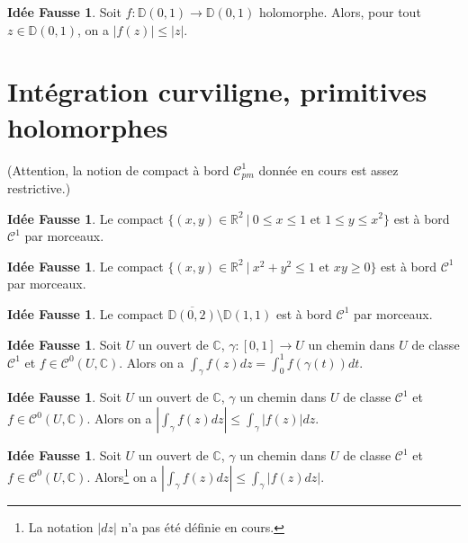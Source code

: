 \documentclass[11pt,a4paper]{article}
\newcommand{\D}{\mathbb{D}}
\newcommand{\R}{\mathbb{R}}
\newcommand{\C}{\mathbb{C}}
\theoremstyle{definition}
\newtheorem{ideeFausse}[theoreme]{Idée Fausse}
\theoremstyle{plain}
\begin{document}
\begin{ideeFausse}
Soit $f : \D(0,1)\to \D(0,1)$ holomorphe.
Alors, pour tout $z\in \D(0,1)$, on a $|f(z)| \leq |z|$.
\end{ideeFausse}



%
%



\section{Intégration curviligne, primitives holomorphes}
(Attention, la notion de compact à bord $\mathcal C^1_{pm}$ donnée en cours est assez restrictive.)

\begin{ideeFausse}
Le compact $\{(x,y)\in \R^2\:|\: 0\leq x \leq 1 \text{ et }1 \leq y \leq x^2\}$ est à bord $\mathcal C^1$ par morceaux.
\end{ideeFausse}

\begin{ideeFausse}
Le compact $\{(x,y)\in \R^2\:|\: x^2+y^2\leq 1 \text{ et } xy\geq 0\}$ est à bord $\mathcal C^1$ par morceaux.
\end{ideeFausse}

\begin{ideeFausse}
Le compact $\overline{\D(0,2)} \setminus \D(1,1)$ est à bord $\mathcal C^1$ par morceaux.
\end{ideeFausse}

\begin{ideeFausse}
Soit $U$ un ouvert de $\C$, $\gamma : [0,1]\to U$ un chemin dans $U$ de classe $\mathcal C^1$ et $f \in \mathcal C^0(U,\C)$.
Alors on a $\int_\gamma f(z)dz = \int_0^1 f(\gamma(t)) dt $.
\end{ideeFausse}

\begin{ideeFausse}
Soit $U$ un ouvert de $\C$, $\gamma$ un chemin dans $U$ de classe $\mathcal C^1$ et $f \in \mathcal C^0(U,\C)$.
Alors on a $\left|\int_\gamma f(z)dz \right| \leq \int_\gamma \left|f(z)\right|dz $.
\end{ideeFausse}

\begin{ideeFausse}
Soit $U$ un ouvert de $\C$, $\gamma$ un chemin dans $U$ de classe $\mathcal C^1$ et $f \in \mathcal C^0(U,\C)$.
Alors\footnote{La notation $|dz|$ n'a pas été définie en cours.} on a $\left|\int_\gamma f(z)dz \right| \leq \int_\gamma \left|f(z)dz \right|$.
\end{ideeFausse}
\end{document}
